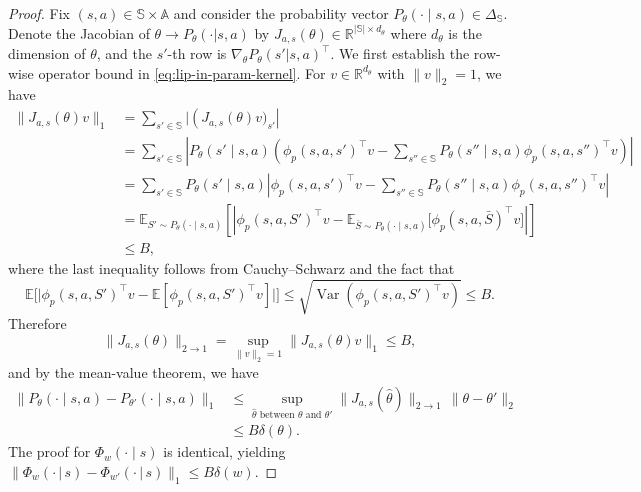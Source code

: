 \documentclass[10pt]{article} %
\theoremstyle{plain}
\theoremstyle{definition}
\theoremstyle{remark}
\newcommand{\bA}{\mathbb{A}}
\newcommand{\bE}{\mathbb{E}}
\newcommand{\bR}{\mathbb{R}}
\newcommand{\bS}{\mathbb{S}}
\begin{document}
\begin{proof}
Fix $(s,a)\in\bS\times\bA$ and consider the probability vector \(
P_\theta(\cdot\mid s,a)\in\Delta_{\bS}
\). Denote the Jacobian of $\theta \rightarrow P_\theta(\cdot|s, a)$ by $J_{a,s}(\theta)\in \bR^{|\bS|\times d_\theta}$ where $d_\theta$ is the dimension of $\theta$, and the $s'$-th row is $\nabla_\theta P_\theta(s'|s,a)^\top$. We first establish the row-wise operator bound in \ref{eq:lip-in-param-kernel}. For $v\in\bR^{d_\theta}$ with $\|v\|_2=1$, we have
\begin{align*}
\|J_{a,s}(\theta)v\|_1
&= \sum_{s'\in\bS} \Big|\left(J_{a,s}(\theta)v\big)_{s'}\right|\\
&=\sum_{s'\in\bS} \left| P_\theta(s'\mid s,a)\left(\phi_p(s,a,s')^\top v-\sum_{s''\in\bS}P_\theta(s''\mid s,a)\phi_p(s,a,s'')^\top v
\right)\right|\\
&=\sum_{s'\in\bS}P_\theta(s'\mid s,a)\left| \phi_p(s,a,s')^\top v-\sum_{s''\in\bS}P_\theta(s''\mid s,a)\phi_p(s,a,s'')^\top v \right|\\
&=\bE_{S'\sim P_\theta(\cdot\mid s,a)}
\left[\left|\phi_p(s,a,S')^\top v - \bE_{\bar S\sim P_\theta(\cdot\mid s,a)}\big[\phi_p(s,a,\bar S)^\top v\big]\right|\right]\\
&\le B,
\end{align*}
where the last inequality follows from Cauchy--Schwarz and the fact that
\[
\bE\Big[\big|\phi_p(s,a,S')^\top v-\bE[\phi_p(s,a,S')^\top v]\big|\Big]
\le \sqrt{\operatorname{Var}(\phi_p(s,a,S')^\top v)} \le B.
\]
Therefore 
\[
\|J_{a,s}(\theta)\|_{2\to1}=\sup_{\|v\|_2=1}\|J_{a,s}(\theta)v\|_1\le B,
\]
and by the mean-value theorem, we have
\begin{align*}
\big\|P_\theta(\cdot\mid s,a)-P_{\theta'}(\cdot\mid s,a)\big\|_1
&\le \sup_{\hat\theta \text{ between } \theta \text{ and } \theta'}\|J_{a,s}(\hat\theta)\|_{2\to1}\,\|\theta-\theta'\|_2\\
&\le B\delta(\theta).
\end{align*}
The proof for $\Phi_w(\cdot\mid s)$ is identical, yielding $\|\Phi_{w}(\cdot\,|\,s)-\Phi_{w'}(\cdot\,|\,s)\|_1\le B\delta(w)$.


\end{proof}
\end{document}

